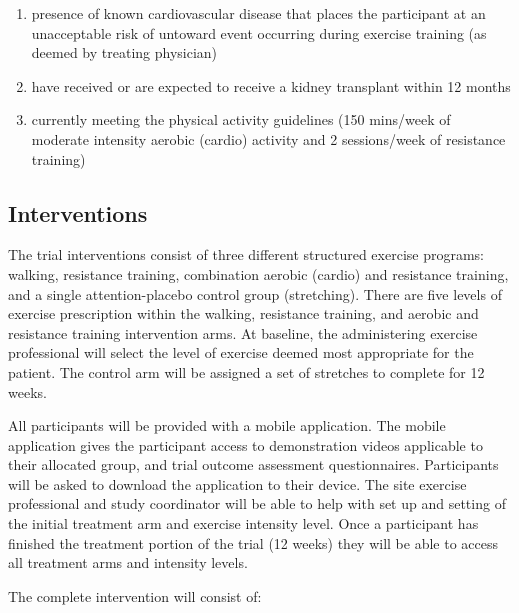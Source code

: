 \documentclass[11pt,parskip=half-]{scrartcl}
\providecommand{\tightlist}{%
  \setlength{\itemsep}{0pt}\setlength{\parskip}{0pt}}
\begin{document}
\begin{enumerate}
  \def\labelenumi{\arabic{enumi}.}
  \tightlist
  \item presence of known cardiovascular disease that places the participant at an unacceptable risk of untoward event occurring during exercise training (as deemed by treating physician)
  \item have received or are expected to receive a kidney transplant within 12 months
  \item currently meeting the physical activity guidelines (150 mins/week of moderate intensity aerobic (cardio) activity and 2 sessions/week of resistance training)
\end{enumerate}


\subsection{Interventions}\label{interventions}

The trial interventions consist of three different structured exercise programs: walking, resistance training, combination aerobic (cardio) and resistance training, and a single attention-placebo control group (stretching). There are five levels of exercise prescription within the walking, resistance training, and aerobic and resistance training intervention arms. At baseline, the administering exercise professional will select the level of exercise deemed most appropriate for the patient. The control arm will be assigned a set of stretches to complete for 12 weeks.

All participants will be provided with a mobile application. The mobile application gives the participant access to demonstration videos applicable to their allocated group, and trial outcome assessment questionnaires. Participants will be asked to download the application to their device. The site exercise professional and study coordinator will be able to help with set up and setting of the initial treatment arm and exercise intensity level. Once a participant has finished the treatment portion of the trial (12 weeks) they will be able to access all treatment arms and intensity levels.

The complete intervention will consist of:
\end{document}

